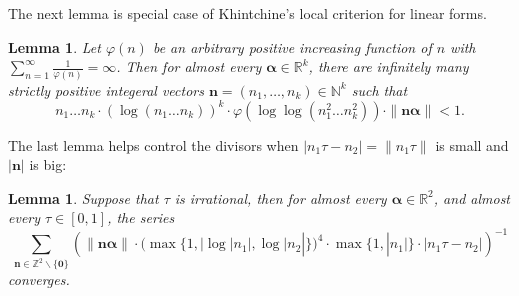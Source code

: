 \documentclass[11pt]{article}
\newtheorem{lem}[thm]{Lemma}
\newcommand{\beq}{\begin{equation}}
\newcommand{\eeq}{\end{equation}}
\newcommand{\fc}{\frac}
\renewcommand{\l}{\left}
\renewcommand{\r}{\right}
\newcommand{\Z}{\mathbb{Z}}
\newcommand{\N}{\mathbb{N}}
\newcommand{\R}{\mathbb{R}}
\renewcommand{\(}{\left(}
\renewcommand{\)}{\right)}
\renewcommand{\bf}{\mathbf}
\newcommand{\n}{\bf{n}}
\newcommand{\bma}{\bm{\alpha}}
\newcommand{\<}{\langle}
\renewcommand{\>}{\rangle}
\begin{document}
The next lemma is special case of Khintchine's local criterion for linear forms.
\begin{lem}\label{Lemma for divergent law for linear forms}
Let $\varphi(n)$ be an arbitrary positive increasing function of $n$ with $\sum_{n=1}^{\infty}\fc{1}{\varphi(n)}=\infty$. Then for almost every $\bma\in \R^k$, there are infinitely many strictly positive integeral vectors $\n=(n_1,\dots, n_k)\in\N^k$ such that 
\beq\label{divergent law for linear forms}
n_1\dots n_k\cdot (\log (n_1\dots n_k))^k\cdot \varphi(\log \log (n_1^2\dots n_k^2)) \cdot \|\n\bma\|<1.
\eeq
\end{lem}
The last lemma helps control the divisors when $|n_1\tau-n_2|=\|n_1\tau\|$ is small and $|\n|$ is big:
\begin{lem}\label{Lemma for large n_1 and n_1* tau-n_2}
Suppose that $\tau$ is irrational, then for almost every $\bma\in\R^2$, and almost every $\tau\in[0,1]$, the series
$$
\sum_{\n\in\Z^2\backslash \{\bf{0}\}} \l(\|\n\bma\|\cdot (\max\{1,|\log |n_1|,\log |n_2|\})^{4} \cdot \max\{1,|n_1|\}\cdot |n_1\tau-n_2|\r)^{-1}
$$
converges.
\end{lem}
\end{document}
